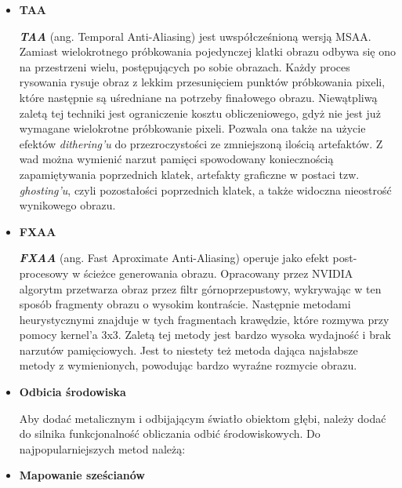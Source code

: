 \begin{itemize}
	\item \textbf{TAA}
	
	\emph{\textbf{TAA}} (ang. Temporal Anti-Aliasing) jest uwspółcześnioną wersją MSAA. Zamiast wielokrotnego próbkowania pojedynczej klatki obrazu odbywa się ono na przestrzeni wielu, postępujących po sobie obrazach. Każdy proces rysowania rysuje obraz z lekkim przesunięciem punktów próbkowania pixeli, które następnie są uśredniane na potrzeby finałowego obrazu. Niewątpliwą zaletą tej techniki jest ograniczenie kosztu obliczeniowego, gdyż nie jest już wymagane wielokrotne próbkowanie pixeli. Pozwala ona także na użycie efektów \emph{dithering'u} do przezroczystości ze zmniejszoną ilością artefaktów. Z wad można wymienić narzut pamięci spowodowany koniecznością zapamiętywania poprzednich klatek, artefakty graficzne w postaci tzw. \emph{ghosting'u}, czyli pozostałości poprzednich klatek, a także widoczna nieostrość wynikowego obrazu.
	
	\item \textbf{FXAA}
	
	\emph{\textbf{FXAA}} (ang. Fast Aproximate Anti-Aliasing) operuje jako efekt post-procesowy w ścieżce generowania obrazu. Opracowany przez NVIDIA algorytm przetwarza obraz przez filtr górnoprzepustowy, wykrywając w ten sposób fragmenty obrazu o wysokim kontraście. Następnie metodami heurystycznymi znajduje w tych fragmentach krawędzie, które rozmywa przy pomocy kernel'a 3x3. Zaletą tej metody jest bardzo wysoka wydajność i brak narzutów pamięciowych. Jest to niestety też metoda dająca najsłabsze metody z wymienionych, powodując bardzo wyraźne rozmycie obrazu.
	
	\item \textbf{Odbicia środowiska}
	
	Aby dodać metalicznym i odbijającym światło obiektom głębi, należy dodać do silnika funkcjonalność obliczania odbić środowiskowych. Do najpopularniejszych metod należą:

	\item \textbf{Mapowanie sześcianów}


\end{itemize}
